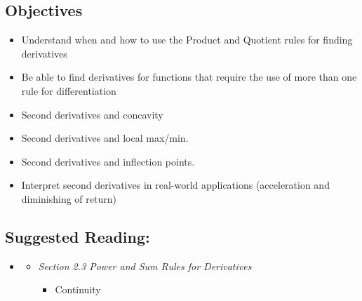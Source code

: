 \vspace{-0.25 in}
\begin{framed}
\subsection*{Objectives}
\begin{itemize}
    \item Understand when and how to use the Product and Quotient rules for finding derivatives
    \item Be able to find derivatives for functions that require the use of more than one rule for differentiation
    \item Second derivatives and concavity
    \item Second derivatives and local max/min.
    \item Second derivatives and inflection points.
    \item Interpret second derivatives in real-world applications (acceleration and diminishing of return)  
\end{itemize}

\subsection*{Suggested Reading:}
\begin{itemize}
\item \cite{Calaway}\footnotemark[1]
   \begin{itemize}
        \item \emph{Section 2.3 Power and Sum Rules for Derivatives}
        \begin{itemize}
            \item Continuity 
        \end{itemize}
    \end{itemize}


\end{itemize}
\end{framed}
